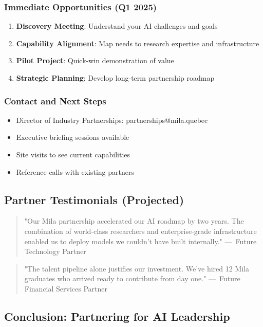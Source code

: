 \subsubsection{Immediate Opportunities (Q1 2025)}
\begin{enumerate}
\item \textbf{Discovery Meeting}: Understand your AI challenges and goals
\item \textbf{Capability Alignment}: Map needs to research expertise and infrastructure
\item \textbf{Pilot Project}: Quick-win demonstration of value
\item \textbf{Strategic Planning}: Develop long-term partnership roadmap
\end{enumerate}

\subsubsection{Contact and Next Steps}
\begin{itemize}
\item Director of Industry Partnerships: partnerships@mila.quebec
\item Executive briefing sessions available
\item Site visits to see current capabilities
\item Reference calls with existing partners
\end{itemize}

\subsection{Partner Testimonials (Projected)}

\begin{quote}
"Our Mila partnership accelerated our AI roadmap by two years. The combination of world-class researchers and enterprise-grade infrastructure enabled us to deploy models we couldn't have built internally."
---~Future Technology Partner
\end{quote}

\begin{quote}
"The talent pipeline alone justifies our investment. We've hired 12 Mila graduates who arrived ready to contribute from day one."
---~Future Financial Services Partner
\end{quote}

\subsection{Conclusion: Partnering for AI Leadership}

